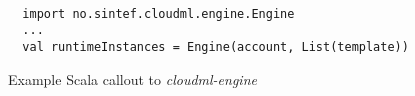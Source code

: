 \begin{figure}
  \begin{center}
    \begin{verbatim}

  import no.sintef.cloudml.engine.Engine
  ...
  val runtimeInstances = Engine(account, List(template))
    \end{verbatim}
  \end{center}
  \caption{Example Scala callout to \emph{cloudml-engine}}
  \label{fig:cloudml-engine-usage}
\end{figure}

